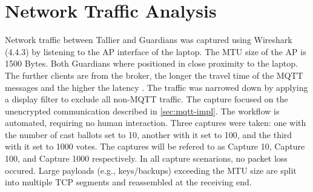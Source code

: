 \section{Network Traffic Analysis}
Network traffic between Tallier and Guardians was captured using Wireshark (4.4.3) by listening to the \ac{AP} interface of the laptop. The \ac{MTU} size of the \ac{AP} is 1500 Bytes. Both Guardians where positioned in close proximity to the laptop. The further clients are from the broker, the longer the travel time of the \ac{MQTT} messages and the higher the latency \cite[20]{protocols}. The traffic was narrowed down by applying a display filter to exclude all non-\ac{MQTT} traffic. The capture focused on the unencrypted communication described in \ref{sec:mqtt-impl}. The workflow is automated, requiring no human interaction. Three captures were taken: one with the number of cast ballots set to 10, another with it set to 100, and the third with it set to 1000 votes. The captures will be refered to as Capture 10, Capture 100, and Capture 1000 respectively. In all capture scenarions, no packet loss occured. Large payloads (e.g., keys/backups) exceeding the \ac{MTU} size are split into multiple TCP segments and reassembled at the receiving end.
